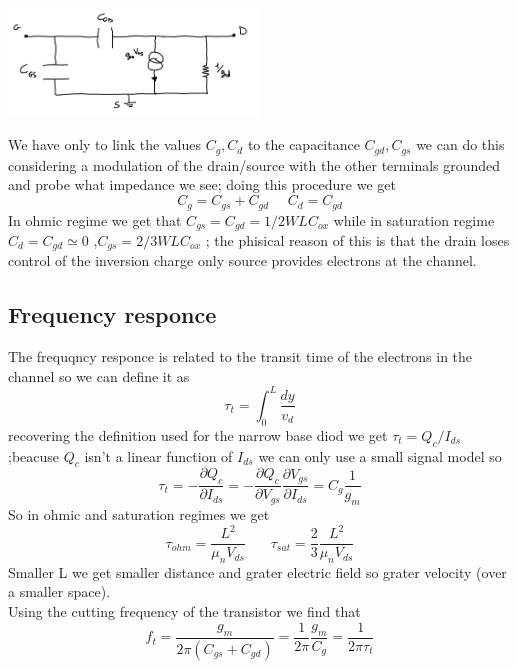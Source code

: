 \centering
\includegraphics[width=0.5\textwidth]{smallsig.png}\\
\raggedright

We have only to link the values $C_g,C_d$ to the capacitance $C_{gd},C_{gs}$ we can do this considering a modulation of the drain/source with the other terminals grounded and probe what impedance we see; doing this procedure we get 
\begin{equation}
C_g=C_{gs}+C_{gd} \ \ \ \ \ \ C_d=C_{gd}
\end{equation}
In ohmic regime we get that $C_{gs}=C_{gd}=1/2WLC_{ox}$ while in saturation regime $C_d=C_{gd}\simeq 0$ ,$C_{gs}=2/3WLC_{ox}$ ; the phisical reason of this is that the drain loses control of the inversion charge only source provides electrons at the channel.\\

\subsection{Frequency responce} 
The frequqncy responce is related to the transit time of the electrons in the channel so we can define it as 
\begin{equation}
\tau_t=\int_0^L \frac{dy}{v_d}
\end{equation}
recovering the definition used for the narrow base diod we get $\tau_t=Q_c/I_{ds}$ ;beacuse $Q_c$ isn't a linear function of $I_{ds}$ we can only use a small signal model so
\begin{equation}
\tau_t= -\frac{\partial Q_c}{\partial I_{ds}}= -\frac{\partial Q_c}{\partial V_{gs}}\frac{\partial V_{gs}}{\partial I_{ds}}=C_g \frac{1}{g_m}
\end{equation}
So in ohmic and saturation regimes we get
\begin{equation}
\tau_{ohm}=\frac{L^2}{\mu_nV_{ds}}\ \ \ \ \ \ \ \ \tau_{sat}=\frac{2}{3} \frac{L^2}{\mu_nV_{ds}}
\end{equation}
Smaller L we get smaller distance and grater electric field so grater velocity (over a smaller space).\\
Using the cutting frequency of the transistor we find that 
\begin{equation}
f_t=\frac{g_m}{2\pi (C_{gs}+C_{gd})}=\frac{1}{2\pi}\frac{g_m}{C_g}=\frac{1}{2\pi \tau_t}
\end{equation}

